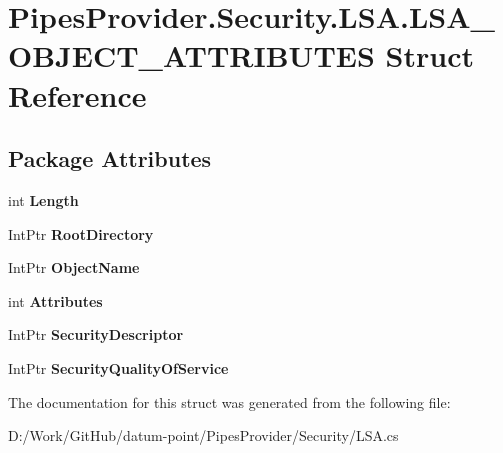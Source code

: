 \hypertarget{struct_pipes_provider_1_1_security_1_1_l_s_a_1_1_l_s_a___o_b_j_e_c_t___a_t_t_r_i_b_u_t_e_s}{}\section{Pipes\+Provider.\+Security.\+L\+S\+A.\+L\+S\+A\+\_\+\+O\+B\+J\+E\+C\+T\+\_\+\+A\+T\+T\+R\+I\+B\+U\+T\+ES Struct Reference}
\label{struct_pipes_provider_1_1_security_1_1_l_s_a_1_1_l_s_a___o_b_j_e_c_t___a_t_t_r_i_b_u_t_e_s}
\subsection*{Package Attributes}
\begin{DoxyCompactItemize}
\item 
\mbox{\label{struct_pipes_provider_1_1_security_1_1_l_s_a_1_1_l_s_a___o_b_j_e_c_t___a_t_t_r_i_b_u_t_e_s_a47b2267f43c5ea4789053114b8a13f00}} 
int {\bfseries Length}
\item 
\mbox{\label{struct_pipes_provider_1_1_security_1_1_l_s_a_1_1_l_s_a___o_b_j_e_c_t___a_t_t_r_i_b_u_t_e_s_a66b8ed917286d00eea70c66ca2af6d0a}} 
Int\+Ptr {\bfseries Root\+Directory}
\item 
\mbox{\label{struct_pipes_provider_1_1_security_1_1_l_s_a_1_1_l_s_a___o_b_j_e_c_t___a_t_t_r_i_b_u_t_e_s_a78f427087b120de8a84afb5dddfc9e75}} 
Int\+Ptr {\bfseries Object\+Name}
\item 
\mbox{\label{struct_pipes_provider_1_1_security_1_1_l_s_a_1_1_l_s_a___o_b_j_e_c_t___a_t_t_r_i_b_u_t_e_s_a7fb617bb90a83f5e040bd91eeafa495b}} 
int {\bfseries Attributes}
\item 
\mbox{\label{struct_pipes_provider_1_1_security_1_1_l_s_a_1_1_l_s_a___o_b_j_e_c_t___a_t_t_r_i_b_u_t_e_s_a85b08b22b2105c4ccf9e73cf6b81fffb}} 
Int\+Ptr {\bfseries Security\+Descriptor}
\item 
\mbox{\label{struct_pipes_provider_1_1_security_1_1_l_s_a_1_1_l_s_a___o_b_j_e_c_t___a_t_t_r_i_b_u_t_e_s_a400ac67d06ed0dd89da96185b233a981}} 
Int\+Ptr {\bfseries Security\+Quality\+Of\+Service}
\end{DoxyCompactItemize}


The documentation for this struct was generated from the following file\+:\begin{DoxyCompactItemize}
\item 
D\+:/\+Work/\+Git\+Hub/datum-\/point/\+Pipes\+Provider/\+Security/L\+S\+A.\+cs\end{DoxyCompactItemize}
